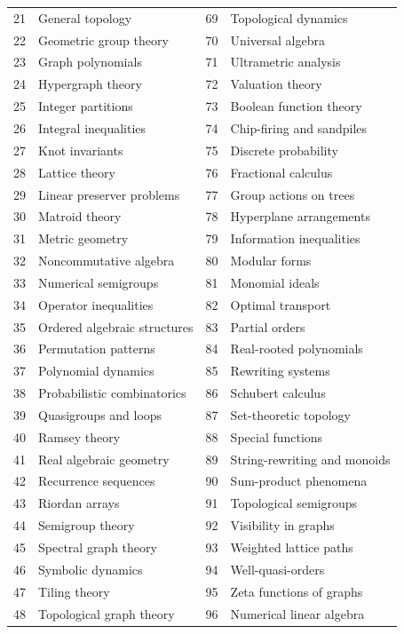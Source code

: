 \documentclass[11pt,a4paper]{article}
\numberwithin{equation}{section}
\theoremstyle{definition}
\theoremstyle{remark}
\begin{document}
\begin{longtable}{@{}r p{6.55cm} r p{6.55cm}@{}}
21 & General topology & 69 & Topological dynamics \\
22 & Geometric group theory & 70 & Universal algebra \\
23 & Graph polynomials & 71 & Ultrametric analysis \\
24 & Hypergraph theory & 72 & Valuation theory \\
25 & Integer partitions & 73 & Boolean function theory \\
26 & Integral inequalities & 74 & Chip-firing and sandpiles \\
27 & Knot invariants & 75 & Discrete probability \\
28 & Lattice theory & 76 & Fractional calculus \\
29 & Linear preserver problems & 77 & Group actions on trees \\
30 & Matroid theory & 78 & Hyperplane arrangements \\
31 & Metric geometry & 79 & Information inequalities \\
32 & Noncommutative algebra & 80 & Modular forms \\
33 & Numerical semigroups & 81 & Monomial ideals \\
34 & Operator inequalities & 82 & Optimal transport \\
35 & Ordered algebraic structures & 83 & Partial orders \\
36 & Permutation patterns & 84 & Real-rooted polynomials \\
37 & Polynomial dynamics & 85 & Rewriting systems \\
38 & Probabilistic combinatorics & 86 & Schubert calculus \\
39 & Quasigroups and loops & 87 & Set-theoretic topology \\
40 & Ramsey theory & 88 & Special functions \\
41 & Real algebraic geometry & 89 & String-rewriting and monoids \\
42 & Recurrence sequences & 90 & Sum-product phenomena \\
43 & Riordan arrays & 91 & Topological semigroups \\
44 & Semigroup theory & 92 & Visibility in graphs \\
45 & Spectral graph theory & 93 & Weighted lattice paths \\
46 & Symbolic dynamics & 94 & Well-quasi-orders \\
47 & Tiling theory & 95 & Zeta functions of graphs \\
48 & Topological graph theory & 96 & Numerical linear algebra \\
\bottomrule
\end{longtable}
\normalsize
\end{document}
